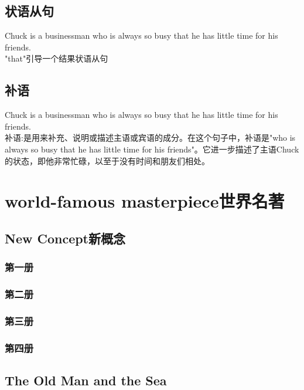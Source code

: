 \documentclass[12pt,twiside,a4paper]{ctexbook}
\numberwithin{chapter}{part}
\begin{document}
\section{状语从句}
Chuck is a businessman who is always so busy that he has little time for his friends. \\
"that"引导一个结果状语从句
\section{补语}
Chuck is a businessman who is always so busy that he has little time for his friends. \\
补语:是用来补充、说明或描述主语或宾语的成分。在这个句子中，补语是"who is always so busy that he has little time for his friends"。它进一步描述了主语Chuck的状态，即他非常忙碌，以至于没有时间和朋友们相处。

\chapter{world-famous masterpiece世界名著}
\section{New Concept新概念}
\subsection{第一册}
\subsection{第二册}
\subsection{第三册}
\subsection{第四册}
\section{The Old Man and the Sea}
\end{document}
